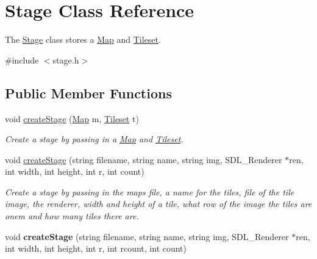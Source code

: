 \hypertarget{classStage}{}\section{Stage Class Reference}
\label{classStage}


The \hyperlink{classStage}{Stage} class stores a \hyperlink{classMap}{Map} and \hyperlink{classTileset}{Tileset}.  




{\ttfamily \#include $<$stage.\+h$>$}

\subsection*{Public Member Functions}
\begin{DoxyCompactItemize}
\item 
void \hyperlink{classStage_a716561c7b2b148b67e7cf4952bae937b}{create\+Stage} (\hyperlink{classMap}{Map} m, \hyperlink{classTileset}{Tileset} t)\hypertarget{classStage_a716561c7b2b148b67e7cf4952bae937b}{}\label{classStage_a716561c7b2b148b67e7cf4952bae937b}

\begin{DoxyCompactList}\small\item\em Create a stage by passing in a \hyperlink{classMap}{Map} and \hyperlink{classTileset}{Tileset}. \end{DoxyCompactList}\item 
void \hyperlink{classStage_ad552bc548e34ff668944a6fc20b2aa0d}{create\+Stage} (string filename, string name, string img, S\+D\+L\+\_\+\+Renderer $\ast$ren, int width, int height, int r, int count)\hypertarget{classStage_ad552bc548e34ff668944a6fc20b2aa0d}{}\label{classStage_ad552bc548e34ff668944a6fc20b2aa0d}

\begin{DoxyCompactList}\small\item\em Create a stage by passing in the maps file, a name for the tiles, file of the tile image, the renderer, width and height of a tile, what row of the image the tiles are onem and how many tiles there are. \end{DoxyCompactList}\item 
void {\bfseries create\+Stage} (string filename, string name, string img, S\+D\+L\+\_\+\+Renderer $\ast$ren, int width, int height, int r, int rcount, int count)\hypertarget{classStage_a871e4913cf2566a1a3a21c9d2e962648}{}\label{classStage_a871e4913cf2566a1a3a21c9d2e962648}


\end{DoxyCompactItemize}
